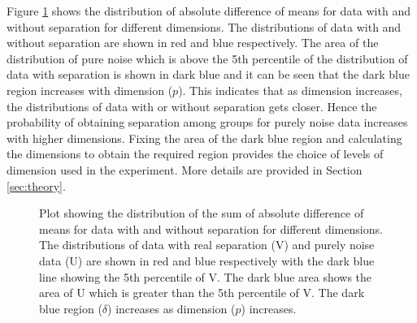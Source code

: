 Figure \ref{fig:dimen} shows the distribution of absolute difference of means for data with and without separation for different dimensions. The distributions of data with and without separation are shown in red and blue respectively. The area of the distribution of pure noise which is above the 5th percentile of the distribution of data with separation is shown in dark blue and it can be seen that the dark blue region increases with dimension ($p$). This indicates that as dimension increases, the distributions of data with or without separation gets closer. Hence the probability of obtaining separation among groups for purely noise data increases with higher dimensions. Fixing the area of the dark blue region and calculating the dimensions to obtain the required region provides the choice of levels of dimension used in the experiment. More details are provided in Section \ref{sec:theory}. 

\begin{figure}[hbtp]
   \centering
       \caption{Plot showing the distribution of the sum of absolute difference of means for data with and without separation for different dimensions. The distributions of data with real separation (V) and purely noise data (U) are shown in red and blue respectively with the dark blue line showing the 5th percentile of V. The dark blue area shows the area of U which is greater than the 5th percentile of V. The dark blue region ($\delta$) increases as dimension ($p$) increases. }
     \label{fig:dimen}
\end{figure}

